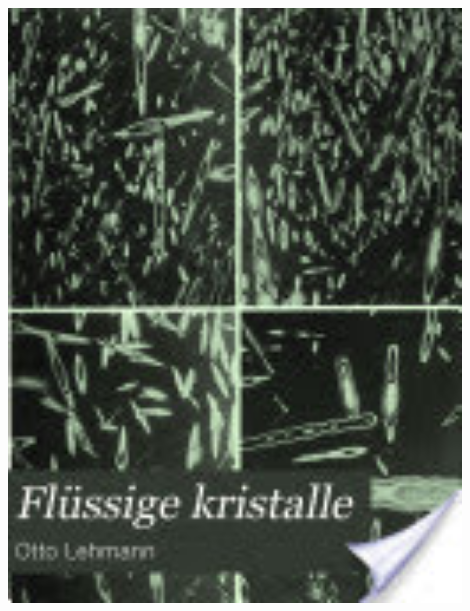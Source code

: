 \documentclass[14pt]{beamer}
\begin{document}
\begin{frame}
\begin{center}
\begin{columns}
\begin{column}{0.5\textwidth}
		\includegraphics[width=0.9\textwidth]{otto_lehmann_book.jpg}
			\end{column}
		\end{columns}
	\end{center}
\end{frame}
\end{document}
